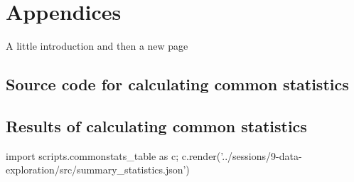 \chapter{Appendices}
A little introduction and then a new page
\pagebreak

\section{Source code for calculating common statistics}\label{app:source-common-statistics}


\pagebreak

\section{Results of calculating common statistics}\label{app:result-common-statistics}
{\small\sffamily
\begin{python}
    import scripts.commonstats_table as c; c.render('../sessions/9-data-exploration/src/summary_statistics.json')
\end{python}
}

